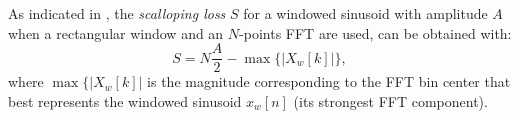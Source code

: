 As indicated in , the \emph{scalloping loss} $S$ for a
windowed sinusoid with amplitude $A$ when a rectangular window and an $N$-points FFT are used, can be obtained with:
\begin{equation}
S = N \frac{A}{2} - \max \{ |X_w[k]| \},
\label{eq:scalloping_loss}
\end{equation}
where $\max \{ |X_w[k]|$ is the magnitude corresponding to the FFT bin center that best represents the windowed sinusoid $x_w[n]$ (its strongest FFT component). 


%
%

